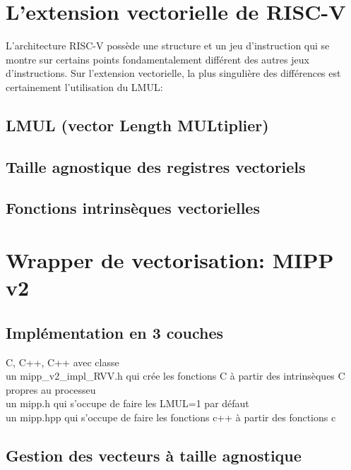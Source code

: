 \documentclass{article}
\begin{document}
\section{L’extension vectorielle de RISC-V}

L'architecture RISC-V possède une structure et un jeu d'instruction qui se montre sur certains points fondamentalement différent des autres jeux d'instructions. Sur l'extension vectorielle, la plus singulière des différences est certainement l'utilisation du LMUL:

\subsection{LMUL (vector \textbf{L}ength \textbf{MUL}tiplier)}

   

\subsection{Taille agnostique des registres vectoriels}

   

\subsection{Fonctions intrinsèques vectorielles}

   

\section{Wrapper de vectorisation: MIPP v2}

\subsection{Implémentation en 3 couches}
   
   C, C++, C++ avec classe\\
   un mipp\_v2\_impl\_RVV.h qui crée les fonctions C à partir des intrinsèques C propres au processeu\\
   un mipp.h qui s'occupe de faire les LMUL=1 par défaut\\
   un mipp.hpp qui s’occupe de faire les fonctions c++ à partir des fonctions c\\

\subsection{Gestion des vecteurs à taille agnostique}
\end{document}
